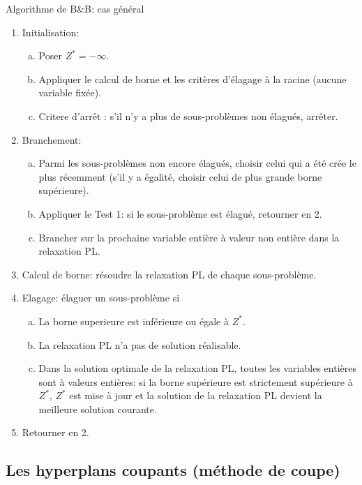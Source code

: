 \begin{algo}{Algorithme de B\&B: cas général}
\begin{enumerate}
\item
Initialisation:
\begin{enumerate}[(a)]
\item
 Poser $Z^* = -\infty$.
\item
 Appliquer le calcul de borne et les critères d'élagage à la racine (aucune variable fixée).
\item
 Critere d'arrêt : s'il n'y a plus de sous-problèmes non élagués, arrêter.
 \end{enumerate}
\item
 Branchement:
 \begin{enumerate}[(a)]
 \item
  Parmi les sous-problèmes non encore élagués, choisir celui qui a été crée le plus récemment (s'il y a égalité, choisir celui de plus grande borne supérieure).
 \item
  Appliquer le Test 1: si le sous-problème est élagué, retourner en 2.
 \item
  Brancher sur la prochaine variable entière à valeur non entière dans la relaxation PL.
 \end{enumerate}
\item
 Calcul de borne: résoudre la relaxation PL de chaque sous-problème.
\item
  Elagage: élaguer un sous-problème si
  \begin{enumerate}[(a)]
  \item
   La borne superieure est inférieure ou égale à $Z^*$.
  \item
   La relaxation PL n'a pas de solution réalisable.
  \item
   Dans la solution optimale de la relaxation PL, toutes les variables entières sont à valeurs entières: si la borne
supérieure est strictement supérieure à $Z^*$, $Z^*$ est mise à jour et la solution de la relaxation PL devient la meilleure solution courante.
 \end{enumerate}
\item
 Retourner en 2.
\end{enumerate}
\end{algo}

\subsection{Les hyperplans coupants (méthode de coupe)}

